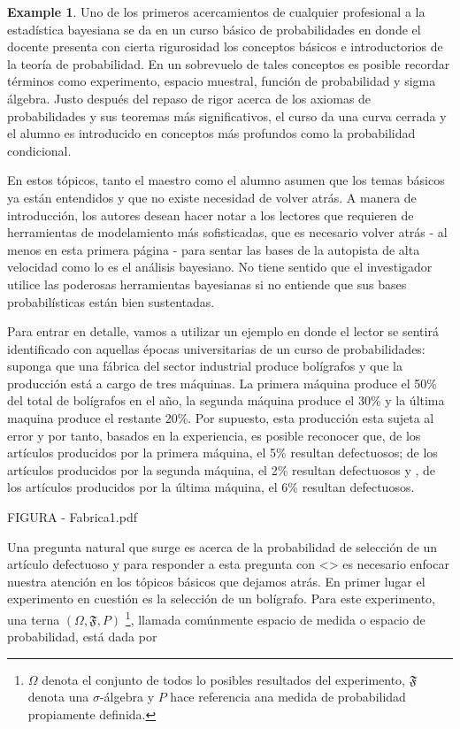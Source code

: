 \documentclass[
  spanish,
  letter]{book}
\theoremstyle{definition}
\theoremstyle{definition}
\newtheorem{example}{Example}[chapter]
\theoremstyle{definition}
\theoremstyle{remark}
\begin{document}
\begin{example}
\protect\hypertarget{exm:unnamed-chunk-14}{}{\label{exm:unnamed-chunk-14} }Uno de los primeros acercamientos de cualquier profesional a la estadística bayesiana se da en un curso básico de probabilidades en donde el docente presenta con cierta rigurosidad los conceptos básicos e introductorios de la teoría de probabilidad. En un sobrevuelo de tales conceptos es posible recordar términos como experimento, espacio muestral, función de probabilidad y sigma álgebra. Justo después del repaso de rigor acerca de los axiomas de probabilidades y sus teoremas más significativos, el curso da una curva cerrada y el alumno es introducido en conceptos más profundos como la probabilidad condicional.

En estos tópicos, tanto el maestro como el alumno asumen que los temas básicos ya están entendidos y que no existe necesidad de volver atrás. A manera de introducción, los autores desean hacer notar a los lectores que requieren de herramientas de modelamiento más sofisticadas, que es necesario volver atrás - al menos en esta primera página - para sentar las bases de la autopista de alta velocidad como lo es el análisis bayesiano. No tiene sentido que el investigador utilice las poderosas herramientas bayesianas si no entiende que sus bases probabilísticas están bien sustentadas.

Para entrar en detalle, vamos a utilizar un ejemplo en donde el lector se sentirá identificado con aquellas épocas universitarias de un curso de probabilidades: suponga que una fábrica del sector industrial produce bolígrafos y que la producción está a cargo de tres máquinas. La primera máquina produce el 50\% del total de bolígrafos en el año, la segunda máquina produce el 30\% y la última maquina produce el restante 20\%. Por supuesto, esta producción esta sujeta al error y por tanto, basados en la experiencia, es posible reconocer que, de los artículos producidos por la primera máquina, el 5\% resultan defectuosos; de los artículos producidos por la segunda máquina, el 2\% resultan defectuosos y , de los artículos producidos por la última máquina, el 6\% resultan defectuosos.

FIGURA - Fabrica1.pdf

Una pregunta natural que surge es acerca de la probabilidad de selección de un artículo defectuoso y para responder a esta pregunta con \textless{}\textgreater{} es necesario enfocar nuestra atención en los tópicos básicos que dejamos atrás. En primer lugar el experimento en cuestión es la selección de un bolígrafo. Para este experimento, una terna \((\Omega, \mathfrak{F}, P)\) \footnote{$\Omega$ denota el conjunto de todos lo posibles resultados del experimento, $\mathfrak{F}$ denota una $\sigma$-álgebra y $P$ hace referencia ana medida de probabilidad propiamente definida.}, llamada comúnmente espacio de medida o espacio de probabilidad, está dada por


\end{example}
\end{document}
